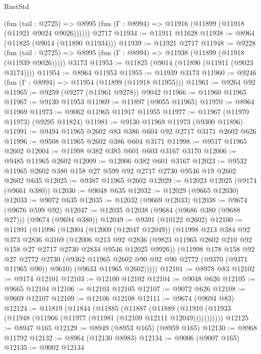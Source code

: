 \begin{lexlean}{RustStd}
\begin{coremodule}
      (fun (tail : @2725) =>
      @8995 (fun (Γ : @8994) => @11916 (@11899 (@11918 (@11921 @9024 @9026))))))
    @2717
@11934 := @11911 @11628
@11938 := @8964 (@11825 (@9014 (@11890 @11934)))
@11939 := @11921 @2717
@11948 := @9228
    (fun (tail : @2725) => @8995 (fun (Γ : @8994) => @11938 (@11899 (@11918 (@11939 @9026)))))
    @3173
@11953 := @11825 (@9014 (@11890 (@11911 (@9023 @3174))))
@11954 := @8964 @11953
@11955 := @11939 @3173
@11960 := @9246 (fun (Γ : @8994) => @11954 (@11899 (@11918 @11955)))
@11961 := @9264 @92
@11965 := @9259 (@9277 (@11961 @9278)) @9042
@11966 := @11960 @11965
@11967 := @9130 @11953
@11969 := @11897 (@9055 @11965)
@11970 := @8964 @11969
@11973 := @9062 @11965 @11917 @11955
@11977 := @11967 (@11970 @11973) (@9295 @11824)
@11981 := @9130 @11969 @11973 (@9300 @11896)
@11991 := @9494 @11965 @2602 @83 @386 @604 @92 @2717 @3171 @2602 @626
@11996 := @9508 @11965 @2602 @386 @604 @3171
@11998 := @9517 @11965 @2602
@12004 := @11998 @382 @385 @601 @603 @3167 @3170
@12006 := @9485 @11965 @2602
@12009 := @12006 @382 @601 @3167
@12023 := @9532 @11965 @2602 @380 @158 @27 @599 @92 @2717 @2730 @9546 @19 @2602 @2602 @635
@12025 := @9387 @11965 @2602
@12029 := @12023 @12025 (@9174 (@9661 @380))
@12030 := @9048 @635
@12032 := @12029 (@9665 @12030)
@12033 := @9072 @635
@12035 := @12032 (@9669 @12033)
@12038 := @9674 (@9676 @599 @92)
@12047 := @12035 @12038 (@9684 (@9686 @380 (@9688 @27))) (@9674 (@9694 @380))
@12049 := @9391 (@10122 @2602)
@12100 := @11991
    (@11996
      (@12004
        (@12009 (@12047 @12049))
        (@11998
          @213
          @384
          @92
          @373
          @2836
          @3169
          (@12006
            @213
            @92
            @2836
            (@9823 @11965 @2602 @210 @92 @158 @27 @2717 @2730 @2834 @9546 @12025 @9926))
          (@11998
            @178
            @158
            @92
            @27
            @2772
            @2730
            (@9362 @11965 @2602 @90 @92 @90 @2772 (@9370 (@9371 @11965 @90)) @9610)
            (@9633 @11965 @2602)))))
@12101 := @8978 @83
@12102 := @9174 @12101
@12103 := @12100 @12102
@12104 := @9048 @626
@12105 := @9665 @12104
@12106 := @12103 @12105
@12107 := @9072 @626
@12108 := @9669 @12107
@12109 := @12106 @12108
@12111 := @9674 (@9694 @83)
@12124 := @11819
    (@11844
      (@11885
        (@11887
          (@11889 (@11910 (@11933 (@11948 (@11966 (@11977 (@11981 (@12109 @12111 @12049)))))))))))
@12125 := @8947 @165
@12129 := @8949 (@8953 @165) (@8959 @165)
@12130 := @8968 @11792
@12132 := @8964 (@12130 @8983)
@12134 := @9006 (@9007 @165)
@12135 := @9002 @12134

\end{coremodule}
\end{lexlean}
